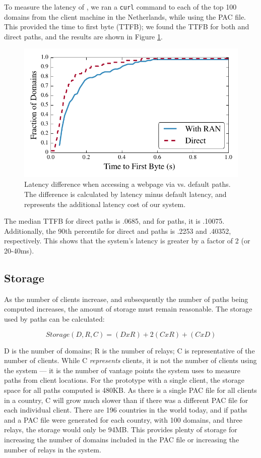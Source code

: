To measure the latency of \system{}, we ran a {\tt curl} command to each of the 
top 100 domains from the client machine in the Netherlands, while using the PAC file. 
This provided the time to first byte (TTFB); we found the TTFB for both \system{} and 
direct paths, and the results are shown in Figure \ref{fig:latency}.  

\begin{figure}[t]
\centering
\includegraphics[width=.5\textwidth]{latency}
\caption{Latency difference when accessing a webpage via \system{} vs. default paths. 
The difference is calculated by \system{} latency minus default latency, and represents 
the additional latency cost of our system.}
\label{fig:latency}
\end{figure}

The median TTFB for direct paths is .0685, and for \system{} paths, it is .10075.  Additionally, 
the 90th percentile for direct and \system{} paths is .2253 and .40352, respectively.  This 
shows that the system's latency is greater by a factor of 2 (or 20-40ms).  

\subsection{Storage}
As the number of clients increase, and subsequently the number of paths being 
computed increases, the amount of storage must remain reasonable.  The storage 
used by paths can be calculated:

\[Storage(D,R,C) = (D x R) + 2(C x R) + (C x D) \]

D is the number of domains; R is the number of relays; C is representative of the number of 
clients.  While C {\it represents} clients, it is not the number of clients using the 
system --- it is the number of vantage points the system uses to measure paths 
from client locations.  For the prototype with a single client, the storage space for all 
paths computed is 480KB.  As there is a single PAC file for all clients in 
a country, C will grow much slower than if there was a different PAC file for 
each individual client.  There are 196 countries in the world today, and if 
paths and a PAC file were generated for each country, with 100 domains, and 
three relays, the storage would only be 94MB.  This provides plenty of storage 
for increasing the number of domains included in the PAC file or increasing 
the number of relays in the system.

